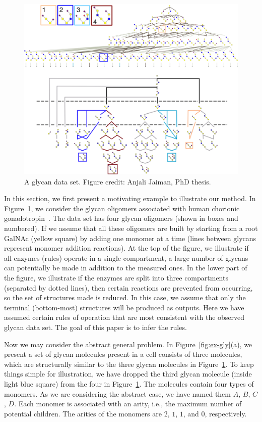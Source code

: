 \begin{figure}[t]
\centering
\includegraphics[width=0.8\linewidth]{gfig2.png}
\caption{A glycan data set. Figure credit: Anjali Jaiman, PhD thesis.}
\label{fig:dataset-gly}
\vspace{-6mm}
\end{figure}



In this section, we first present a motivating example to illustrate our method.
In Figure~\ref{fig:dataset-gly},
we consider the glycan oligomers associated with human chorionic
gonadotropin~\cite{Harrd1992}.
The data set has four glycan oligomers (shown in boxes and numbered). If we assume that all these oligomers
are built by starting from a root GalNAc (yellow square) by adding one monomer at a
time (lines between glycans represent monomer addition reactions). At the top of the figure, we illustrate
if all enzymes (rules) operate in a
single compartment, a large number of glycans can potentially be made in addition to the measured ones.
In the lower part of the figure, we illustrate if the enzymes are split into three compartments
(separated by dotted lines), then certain reactions are prevented from occurring, so the set of structures
made is reduced.
In this case, we assume that only the terminal (bottom-most) structures will be produced as outputs.
Here we have assumed certain rules of operation that are most consistent with the observed glycan data set.
The goal of this paper is to infer the rules.


Now we may consider the abstract general problem. In Figure~\ref{fig:ex-gly}(a), we present a set of
glycan molecules present in a cell consists of three molecules, which are structurally similar to the
three glycan molecules in Figure~\ref{fig:dataset-gly}.
To keep things simple for illustration, we have dropped the third glycan molecule
(inside light blue square) from the four in
Figure~\ref{fig:dataset-gly}.
%
The molecules contain four types of monomers.
As we are considering the abstract case, we have named them $A$, $B$, $C$, $D$.
Each monomer is associated with an arity, i.e., the maximum number of potential children.
The arities of the monomers are $2$, $1$, $1$, and $0$, respectively.

